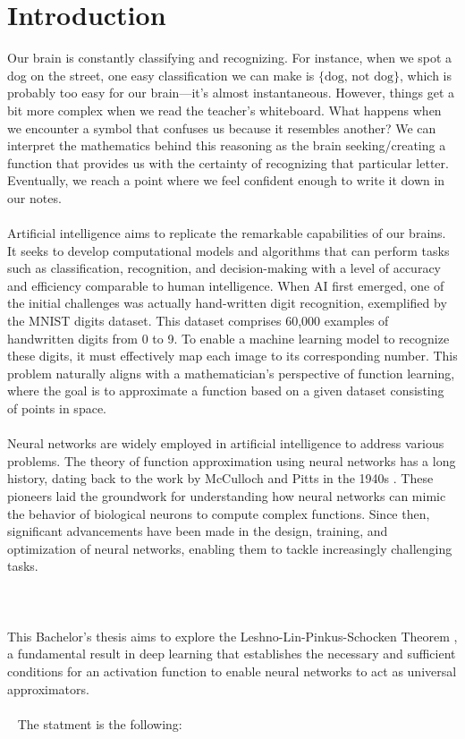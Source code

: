 \documentclass[../main.tex]{subfiles}
\begin{document}
    \chapter{Introduction} \label{ch:intro}
    


\noindent Our brain is constantly classifying and recognizing. For instance, when we spot a dog on the street, one easy classification we can make is  $\{ \text{dog, not dog} \}$, which is probably too easy for our brain—it's almost instantaneous.  However, things get a bit more complex when we read the teacher's whiteboard. What happens when we encounter a symbol that confuses us because it resembles another?
We can interpret the mathematics behind this reasoning as the brain seeking/creating a function that provides us with the certainty of recognizing that particular letter. Eventually, we reach a point where we feel confident enough to write it down in our notes. \\ \\
Artificial intelligence aims to replicate the remarkable capabilities of our brains. It seeks to develop computational models and algorithms that can perform tasks such as classification, recognition, and decision-making with a level of accuracy and efficiency comparable to human intelligence. When AI first emerged, one of the initial challenges was actually hand-written digit recognition, exemplified by the MNIST digits dataset. This dataset comprises 60,000 examples of handwritten digits from 0 to 9. To enable a machine learning model to recognize these digits, it must effectively map each image to its corresponding number.
This problem naturally aligns with a mathematician's perspective of function learning, where the goal is to approximate a function based on a given dataset consisting of points in space.
\\ \\ 
Neural networks are widely employed in artificial intelligence to address various problems. The theory of function approximation using neural networks has a long history, dating back to the work by McCulloch and Pitts in the 1940s \cite{McCulloch1943}. These pioneers laid the groundwork for understanding how neural networks can mimic the behavior of biological neurons to compute complex functions. Since then, significant advancements have been made in the design, training, and optimization of neural networks, enabling them to tackle increasingly challenging tasks.
\\ \\  \\ \\ 
This Bachelor's thesis aims to explore the Leshno-Lin-Pinkus-Schocken Theorem \cite{leshno1993multilayer}, a fundamental result in deep learning that establishes the necessary and sufficient conditions for an activation function to enable neural networks to act as universal approximators. 
\\ \\ 
The statment is the following:
\end{document}
